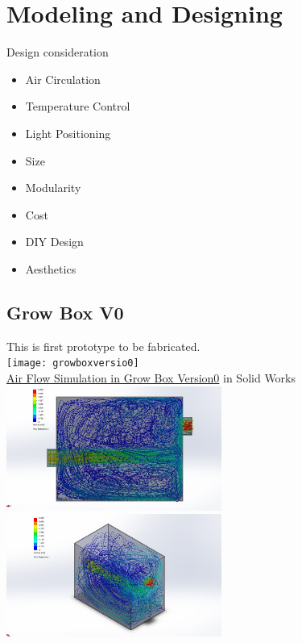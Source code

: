 \documentclass[a4paper,12pt,oneside]{book}
\begin{document}
\section{Modeling and Designing}
Design consideration
\begin{itemize}
\item Air Circulation
\item Temperature Control
\item Light Positioning
\item Size
\item Modularity
\item Cost
\item DIY Design
\item Aesthetics
\end{itemize}

\subsection{Grow Box V0}
This is first prototype to be fabricated.\\
\texttt{[image: growboxversio0]}\\
\href{https://www.youtube.com/watch?v=nuCj2OUl2X8}{Air Flow Simulation in Grow Box Version0} in Solid Works\\
\includegraphics[width=200pt]{version_0_FV}
\includegraphics[width=200pt]{version_0_ISO}
\end{document}

